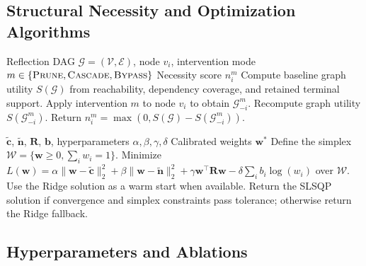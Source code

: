 \documentclass[a4paper,fleqn]{cas-sc}
\begin{document}
\subsection{Structural Necessity and Optimization Algorithms}
\label{app:algorithms}

\begin{algorithm}[ht]
\caption{Structural Necessity Computation}
\label{alg:supp-structural-necessity}
\begin{algorithmic}[1]
\Require Reflection DAG $\mathcal{G}=(\mathcal{V},\mathcal{E})$, node $v_i$, intervention mode $m\in\{\textsc{Prune},\textsc{Cascade},\textsc{Bypass}\}$
\Ensure Necessity score $n_i^{m}$
\State Compute baseline graph utility $S(\mathcal{G})$ from reachability, dependency coverage, and retained terminal support.
\State Apply intervention $m$ to node $v_i$ to obtain $\mathcal{G}_{-i}^{m}$.
\State Recompute graph utility $S(\mathcal{G}_{-i}^{m})$.
\State Return $n_i^{m}=\max(0,S(\mathcal{G})-S(\mathcal{G}_{-i}^{m}))$.
\end{algorithmic}
\end{algorithm}

\begin{algorithm}[ht]
\caption{SC-FMA QP Calibration}
\label{alg:supp-scfma-qp}
\begin{algorithmic}[1]
\Require $\tilde{\mathbf{c}}$, $\tilde{\mathbf{n}}$, $\mathbf{R}$, $\mathbf{b}$, hyperparameters $\alpha,\beta,\gamma,\delta$
\Ensure Calibrated weights $\mathbf{w}^*$
\State Define the simplex $\mathcal{W}=\{\mathbf{w}\ge 0,\sum_i w_i=1\}$.
\State Minimize $L(\mathbf{w})=\alpha\|\mathbf{w}-\tilde{\mathbf{c}}\|_2^2+\beta\|\mathbf{w}-\tilde{\mathbf{n}}\|_2^2+\gamma\mathbf{w}^\top\mathbf{R}\mathbf{w}-\delta\sum_i b_i\log(w_i)$ over $\mathcal{W}$.
\State Use the Ridge solution as a warm start when available.
\State Return the SLSQP solution if convergence and simplex constraints pass tolerance; otherwise return the Ridge fallback.
\end{algorithmic}
\end{algorithm}

\subsection{Hyperparameters and Ablations}
\label{app:hyperparameters-ablation}
\end{document}
